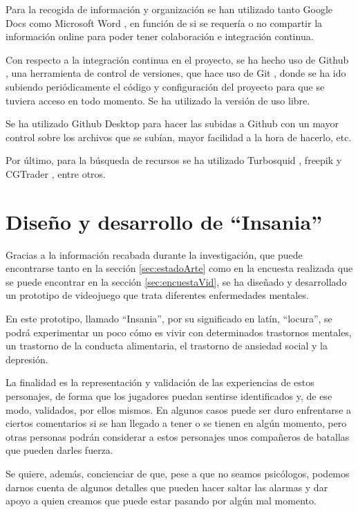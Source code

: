 \documentclass[12pt, a4paper,twoside,titlepage]{book}
\begin{document}
Para la recogida de información y organización se han utilizado tanto Google Docs \cite{googledocs} como Microsoft Word \cite{word}, en función de si se requería o no compartir la información online para poder tener colaboración e integración continua.

Con respecto a la integración continua en el proyecto, se ha hecho uso de Github \cite{github}, una herramienta de control de versiones, que hace uso de Git \cite{git}, donde se ha ido subiendo periódicamente el código y configuración del proyecto para que se tuviera acceso en todo momento. Se ha utilizado la versión de uso libre. 

Se ha utilizado Github Desktop  para hacer las subidas a Github con un mayor control sobre los archivos que se subían, mayor facilidad a la hora de hacerlo, etc. 

Por último, para la búsqueda de recursos se ha utilizado Turbosquid , freepik  y CGTrader , entre otros. 


\chapter{Diseño y desarrollo de ``Insania''}
\label{sec:diseñoInsania}
Gracias a la información recabada durante la investigación, que puede encontrarse tanto en la sección \ref{sec:estadoArte} como en la encuesta realizada que se puede encontrar en la sección \ref{sec:encuestaVid}, se ha diseñado y desarrollado un prototipo de videojuego que trata diferentes enfermedades mentales. 

En este prototipo, llamado ``Insania'', por su significado en latín, ``locura'', se podrá experimentar un poco cómo es vivir con determinados trastornos mentales, un trastorno de la conducta alimentaria, el trastorno de ansiedad social y la depresión. 

La finalidad es la representación y validación de las experiencias de estos personajes, de forma que los jugadores puedan sentirse identificados y, de ese modo, validados, por ellos mismos. En algunos casos puede ser duro enfrentarse a ciertos comentarios si se han llegado a tener o se tienen en algún momento, pero otras personas podrán considerar a estos personajes unos compañeros de batallas que pueden darles fuerza.

Se quiere, además, concienciar de que, pese a que no seamos psicólogos, podemos darnos cuenta de algunos detalles que pueden hacer saltar las alarmas y dar apoyo a quien creamos que puede estar pasando por algún mal momento. 
\end{document}

